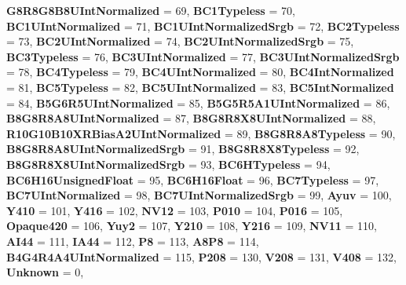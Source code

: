 \begin{DoxyCompactItemize}
{\bfseries G8\+R8\+G8\+B8\+U\+Int\+Normalized} = 69, 
{\bfseries B\+C1\+Typeless} = 70, 
{\bfseries B\+C1\+U\+Int\+Normalized} = 71, 
\newline
{\bfseries B\+C1\+U\+Int\+Normalized\+Srgb} = 72, 
{\bfseries B\+C2\+Typeless} = 73, 
{\bfseries B\+C2\+U\+Int\+Normalized} = 74, 
{\bfseries B\+C2\+U\+Int\+Normalized\+Srgb} = 75, 
\newline
{\bfseries B\+C3\+Typeless} = 76, 
{\bfseries B\+C3\+U\+Int\+Normalized} = 77, 
{\bfseries B\+C3\+U\+Int\+Normalized\+Srgb} = 78, 
{\bfseries B\+C4\+Typeless} = 79, 
\newline
{\bfseries B\+C4\+U\+Int\+Normalized} = 80, 
{\bfseries B\+C4\+Int\+Normalized} = 81, 
{\bfseries B\+C5\+Typeless} = 82, 
{\bfseries B\+C5\+U\+Int\+Normalized} = 83, 
\newline
{\bfseries B\+C5\+Int\+Normalized} = 84, 
{\bfseries B5\+G6\+R5\+U\+Int\+Normalized} = 85, 
{\bfseries B5\+G5\+R5\+A1\+U\+Int\+Normalized} = 86, 
{\bfseries B8\+G8\+R8\+A8\+U\+Int\+Normalized} = 87, 
\newline
{\bfseries B8\+G8\+R8\+X8\+U\+Int\+Normalized} = 88, 
{\bfseries R10\+G10\+B10\+X\+R\+Bias\+A2\+U\+Int\+Normalized} = 89, 
{\bfseries B8\+G8\+R8\+A8\+Typeless} = 90, 
{\bfseries B8\+G8\+R8\+A8\+U\+Int\+Normalized\+Srgb} = 91, 
\newline
{\bfseries B8\+G8\+R8\+X8\+Typeless} = 92, 
{\bfseries B8\+G8\+R8\+X8\+U\+Int\+Normalized\+Srgb} = 93, 
{\bfseries B\+C6\+H\+Typeless} = 94, 
{\bfseries B\+C6\+H16\+Unsigned\+Float} = 95, 
\newline
{\bfseries B\+C6\+H16\+Float} = 96, 
{\bfseries B\+C7\+Typeless} = 97, 
{\bfseries B\+C7\+U\+Int\+Normalized} = 98, 
{\bfseries B\+C7\+U\+Int\+Normalized\+Srgb} = 99, 
\newline
{\bfseries Ayuv} = 100, 
{\bfseries Y410} = 101, 
{\bfseries Y416} = 102, 
{\bfseries N\+V12} = 103, 
\newline
{\bfseries P010} = 104, 
{\bfseries P016} = 105, 
{\bfseries Opaque420} = 106, 
{\bfseries Yuy2} = 107, 
\newline
{\bfseries Y210} = 108, 
{\bfseries Y216} = 109, 
{\bfseries N\+V11} = 110, 
{\bfseries A\+I44} = 111, 
\newline
{\bfseries I\+A44} = 112, 
{\bfseries P8} = 113, 
{\bfseries A8\+P8} = 114, 
{\bfseries B4\+G4\+R4\+A4\+U\+Int\+Normalized} = 115, 
\newline
{\bfseries P208} = 130, 
{\bfseries V208} = 131, 
{\bfseries V408} = 132, 
{\bfseries Unknown} = 0, 
\newline

\end{DoxyCompactItemize}

